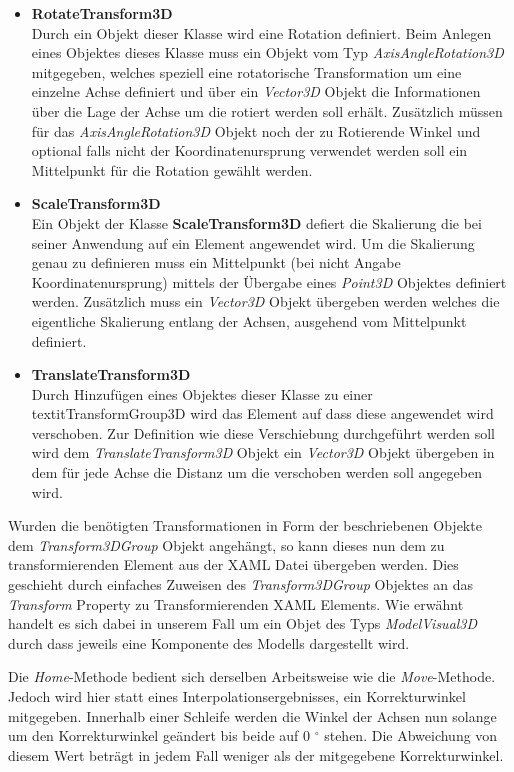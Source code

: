 \begin{itemize}
\item \textbf{RotateTransform3D}\\
Durch ein Objekt dieser Klasse wird eine Rotation definiert. Beim Anlegen eines Objektes dieses Klasse muss ein Objekt vom Typ \textit{AxisAngleRotation3D} mitgegeben, welches speziell eine rotatorische Transformation um eine einzelne Achse definiert und über ein \textit{Vector3D} Objekt die Informationen über die Lage der Achse um die rotiert werden soll erhält. Zusätzlich müssen für das \textit{AxisAngleRotation3D} Objekt noch der zu Rotierende Winkel und optional falls nicht der Koordinatenursprung verwendet werden soll ein Mittelpunkt für die Rotation gewählt werden.

\item \textbf{ScaleTransform3D}\\
Ein Objekt der Klasse \textbf{ScaleTransform3D} defiert die Skalierung die bei seiner Anwendung auf ein Element angewendet wird. Um die Skalierung genau zu definieren muss ein Mittelpunkt (bei nicht Angabe Koordinatenursprung) mittels der Übergabe eines \textit{Point3D} Objektes definiert werden. Zusätzlich muss ein \textit{Vector3D} Objekt übergeben werden welches die eigentliche Skalierung entlang der Achsen, ausgehend vom Mittelpunkt definiert.

\item \textbf{TranslateTransform3D}\\
Durch Hinzufügen eines Objektes dieser Klasse zu einer \\textit{TransformGroup3D} wird das Element auf dass diese angewendet wird verschoben. Zur Definition wie diese Verschiebung durchgeführt werden soll wird dem \textit{TranslateTransform3D} Objekt ein \textit{Vector3D} Objekt übergeben in dem für jede Achse die Distanz um die verschoben werden soll angegeben wird.
\end{itemize}

Wurden die benötigten Transformationen in Form der beschriebenen Objekte dem \textit{ Transform3DGroup} Objekt angehängt, so kann dieses nun dem zu transformierenden Element aus der XAML Datei übergeben werden. Dies geschieht durch einfaches Zuweisen des \textit{ Transform3DGroup} Objektes an das \textit{ Transform} Property zu Transformierenden XAML Elements. Wie erwähnt handelt es sich dabei in unserem Fall um ein Objet des Typs \textit{ModelVisual3D} durch dass jeweils eine Komponente des Modells dargestellt wird.

Die \textit{Home}-Methode bedient sich derselben Arbeitsweise wie die \textit{Move}-Methode. Jedoch wird hier statt eines Interpolationsergebnisses, ein Korrekturwinkel mitgegeben. Innerhalb einer Schleife werden die Winkel der Achsen nun solange um den Korrekturwinkel geändert bis beide auf 0 $^\circ$ stehen. Die Abweichung von diesem Wert beträgt in jedem Fall weniger als der mitgegebene Korrekturwinkel.

